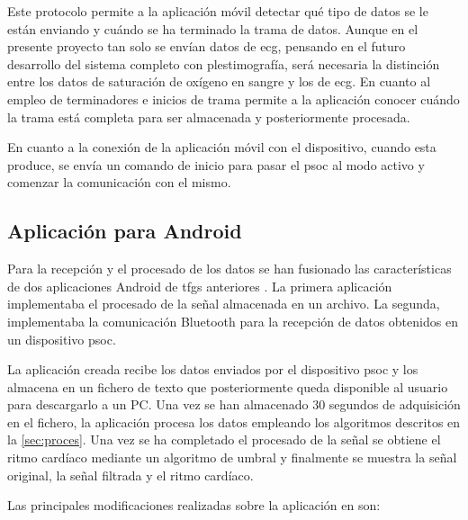 Este protocolo permite a la aplicación móvil detectar qué tipo de datos se le están enviando y cuándo se ha terminado la trama de datos. Aunque en el presente proyecto tan solo se envían datos de \acrshort{ecg}, pensando en el futuro desarrollo del sistema completo con plestimografía, será necesaria la distinción entre los datos de saturación de oxígeno en sangre y los de \acrshort{ecg}. En cuanto al empleo de terminadores e inicios de trama permite a la aplicación conocer cuándo la trama está completa para ser almacenada y posteriormente procesada.

En cuanto a la conexión de la aplicación móvil con el dispositivo, cuando esta produce, se envía un comando de inicio para pasar el \acrshort{psoc} al modo activo y comenzar la comunicación con el mismo.

\subsection{Aplicación para Android}

Para la recepción y el procesado de los datos se han fusionado las características de dos aplicaciones Android de \acrshort{tfg}s anteriores \cite{Soldado_2015, tfg_fran}. La primera aplicación implementaba el procesado de la señal almacenada en un archivo. La segunda, implementaba la comunicación Bluetooth para la recepción de datos obtenidos en un dispositivo \acrshort{psoc}.

La aplicación creada recibe los datos enviados por el dispositivo \acrshort{psoc} y los almacena en un fichero de texto que posteriormente queda disponible al usuario para descargarlo a un PC. Una vez se han almacenado 30 segundos de adquisición en el fichero, la aplicación procesa los datos empleando los algoritmos descritos en la \autoref{sec:proces}. Una vez se ha completado el procesado de la señal se obtiene el ritmo cardíaco mediante un algoritmo de umbral y finalmente se muestra la señal original, la señal filtrada y el ritmo cardíaco. 


Las principales modificaciones realizadas sobre la aplicación en \cite{Soldado_2015} son:

